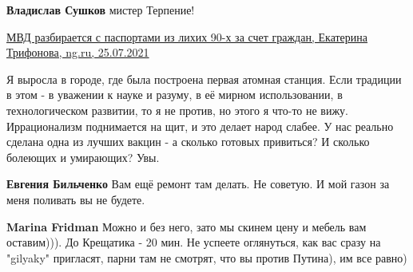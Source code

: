 \begin{itemize}
\begin{itemize}
\textbf{Владислав Сушков} мистер Терпение!

 

\href{https://www.ng.ru/politics/2021-07-25/1_8207_passport.html}{%
МВД разбирается с паспортами из лихих 90-х за счет граждан,  Екатерина Трифонова, ng.ru, 25.07.2021%
}

 

Я выросла в городе, где была построена первая атомная станция. Если традиции в
этом - в уважении к науке и разуму, в её мирном использовании, в
технологическом развитии, то я не против, но этого я что-то не вижу.
Иррационализм поднимается на щит, и это делает народ слабее. У нас реально
сделана одна из лучших вакцин - а сколько готовых привиться? И сколько болеющих
и умирающих? Увы.


 
\textbf{Евгения Бильченко} Вам ещё ремонт там делать. Не советую. И мой газон за меня поливать вы не будете.

 
\textbf{Marina Fridman} Можно и без него, зато мы скинем цену и мебель вам оставим))). До Крещатика - 20 мин. Не успеете оглянуться, как вас сразу на "gilyaky" пригласят, парни там не смотрят, что вы против Путина), им все равно)



\end{itemize}
\end{itemize}
